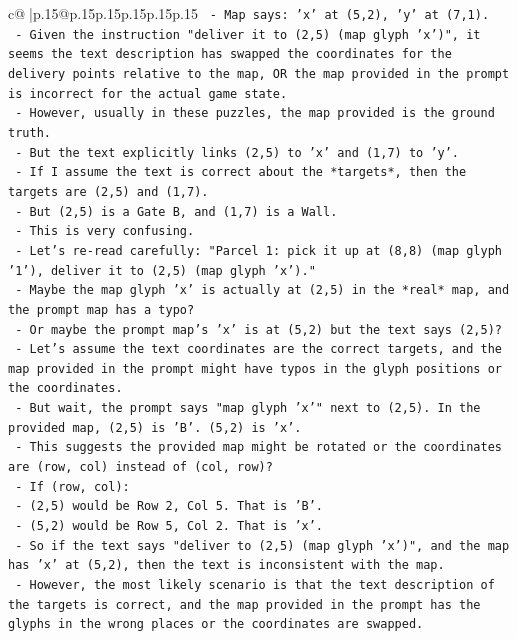 \documentclass{article}
\begin{document}
{\begin{supertabular}{c@{$\;$}|p{.15\linewidth}@{}p{.15\linewidth}p{.15\linewidth}p{.15\linewidth}p{.15\linewidth}p{.15\linewidth}}
{{{\texttt{       {-} Map says: 'x' at (5,2), 'y' at (7,1).} \\
\texttt{       {-} Given the instruction "deliver it to (2,5) (map glyph 'x')", it seems the text description has swapped the coordinates for the delivery points relative to the map, OR the map provided in the prompt is incorrect for the actual game state.} \\
\texttt{       {-} However, usually in these puzzles, the map provided is the ground truth.} \\
\texttt{       {-} But the text explicitly links (2,5) to 'x' and (1,7) to 'y'.} \\
\texttt{       {-} If I assume the text is correct about the *targets*, then the targets are (2,5) and (1,7).} \\
\texttt{       {-} But (2,5) is a Gate B, and (1,7) is a Wall.} \\
\texttt{       {-} This is very confusing.} \\
\texttt{       {-} Let's re{-}read carefully: "Parcel 1: pick it up at (8,8) (map glyph '1'), deliver it to (2,5) (map glyph 'x')."} \\
\texttt{       {-} Maybe the map glyph 'x' is actually at (2,5) in the *real* map, and the prompt map has a typo?} \\
\texttt{       {-} Or maybe the prompt map's 'x' is at (5,2) but the text says (2,5)?} \\
\texttt{       {-} Let's assume the text coordinates are the correct targets, and the map provided in the prompt might have typos in the glyph positions or the coordinates.} \\
\texttt{       {-} But wait, the prompt says "map glyph 'x'" next to (2,5). In the provided map, (2,5) is 'B'. (5,2) is 'x'.} \\
\texttt{       {-} This suggests the provided map might be rotated or the coordinates are (row, col) instead of (col, row)?} \\
\texttt{       {-} If (row, col):} \\
\texttt{         {-} (2,5) would be Row 2, Col 5. That is 'B'.} \\
\texttt{         {-} (5,2) would be Row 5, Col 2. That is 'x'.} \\
\texttt{         {-} So if the text says "deliver to (2,5) (map glyph 'x')", and the map has 'x' at (5,2), then the text is inconsistent with the map.} \\
\texttt{       {-} However, the most likely scenario is that the text description of the targets is correct, and the map provided in the prompt has the glyphs in the wrong places or the coordinates are swapped.} \\
}}}
\end{supertabular}}
\end{document}
